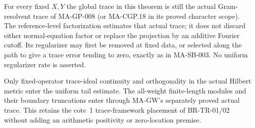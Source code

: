 For every fixed $X,Y$ the global trace in this
theorem is still the actual Gram-resolvent trace
of MA-GP-008 (or MA-CGP.18 in its proved character
scope).  The reference-level factorization estimates
that actual trace; it does not discard either
normal-equation factor or replace the projection
by an additive Fourier cutoff.
Its regularizer may first be removed at fixed
data, or selected along the path to give a trace
error tending to zero, exactly as in MA-SB-003.
No uniform regularizer rate is asserted.

Only fixed-operator trace-ideal continuity and
orthogonality in the actual Hilbert metric enter
the uniform tail estimate.  The all-weight
finite-length modules and their boundary truncations
enter through MA-GW's separately proved actual
trace.  This retains the cote~1 trace-framework
placement of BR-TR-01/02 without adding an
arithmetic positivity or zero-location premise.
